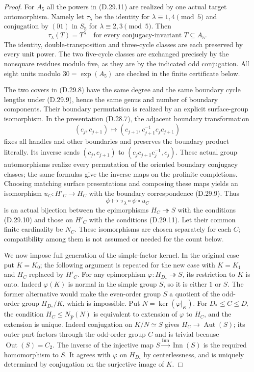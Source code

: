 \begin{proof}
For $A_5$ all the powers in \textup{(D.29.11)} are
realized by one actual target automorphism.  Namely
let $\tau_\lambda$ be the identity for
$\lambda\equiv1,4\pmod5$ and conjugation by $(01)$
in $S_5$ for $\lambda\equiv2,3\pmod5$.
Then
\[
       \tau_\lambda(T)=T^\lambda
       \quad\text{for every conjugacy-invariant }T\subseteq A_5.
 \tag{D.29.12}
\]
The identity, double-transposition and three-cycle
classes are each preserved by every unit power.
The two five-cycle classes are exchanged precisely
by the nonsquare residues modulo five, as they are
by the indicated odd conjugation.  All eight units
modulo $30=\exp(A_5)$ are checked in the finite
certificate below.

The two covers in \textup{(D.29.8)} have the same
degree and the same boundary cycle lengths under
\textup{(D.29.9)}, hence the same genus and number
of boundary components.  Their boundary permutation
is realized by an explicit surface-group isomorphism.
In the presentation \textup{(D.28.7)}, the adjacent
boundary transformation
\[
 (c_j,c_{j+1})\longmapsto
       (c_{j+1},c_{j+1}^{-1}c_jc_{j+1})
 \tag{D.29.13}
\]
fixes all handles and other boundaries and preserves
the boundary product literally.  Its inverse sends
$(c_j,c_{j+1})$ to
$(c_jc_{j+1}c_j^{-1},c_j)$.
These actual group automorphisms realize every
permutation of the oriented boundary conjugacy
classes; the same formulas give the inverse maps
on the profinite completions.
Choosing matching surface presentations and composing
these maps yields an isomorphism
$u_C:H'_C\to H_C$ with the boundary correspondence
\textup{(D.29.9)}.
Thus
\[
                   \psi\longmapsto
                \tau_\lambda\circ\psi\circ u_C
 \tag{D.29.14}
\]
is an actual bijection between the epimorphisms
$H_C\twoheadrightarrow S$ with the conditions
\textup{(D.29.10)} and those on $H'_C$ with the
conditions \textup{(D.29.11)}.
Let their common finite cardinality be $N_C$.
These isomorphisms are chosen separately for each
$C$; compatibility among them is not assumed or
needed for the count below.

We now impose full generation of the simple-factor
kernel.  In the original case put $K=K_0$; the
following argument is repeated for the new case
with $K=K_1$ and $H_C$ replaced by $H'_C$.
For any epimorphism
$\varphi:H_{D_*}\twoheadrightarrow S$, its
restriction to $K$ is onto.  Indeed $\varphi(K)$ is
normal in the simple group $S$, so it is either $1$
or $S$.  The former alternative would make the
even-order group $S$ a quotient of the odd-order
group $H_{D_*}/K$, which is impossible.
Put $N=\ker(\varphi|_K)$.
For $D_*\leq C\leq D$, the condition
$H_C\leq N_{\widehat F}(N)$ is equivalent to
extension of $\varphi$ to $H_C$, and the extension
is unique.  Indeed conjugation on $K/N\simeq S$
gives $H_C\to\operatorname{Aut}(S)$; its outer
part factors through the odd-order group $C$ and is
trivial because $\operatorname{Out}(S)=C_2$.
The inverse of the injective map
$S\xrightarrow{\operatorname{Inn}}\operatorname{Inn}(S)$
is the required homomorphism to $S$.
It agrees with $\varphi$ on $H_{D_*}$ by
centerlessness, and is uniquely determined by
conjugation on the surjective image of $K$.


\end{proof}
